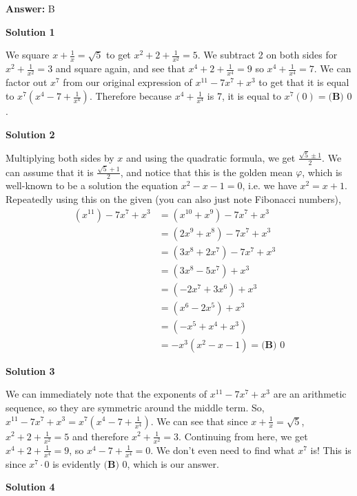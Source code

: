 \begin{enumerate}
 \textbf{Answer: }B



\textbf{Solution 1}

We square $x+\frac{1}{x}=\sqrt5$ to get $x^2+2+\frac{1}{x^2}=5$. We subtract 2 on both sides for $x^2+\frac{1}{x^2}=3$ and square again, and see that $x^4+2+\frac{1}{x^4}=9$ so $x^4+\frac{1}{x^4}=7$. We can factor out $x^7$ from our original expression of $x^{11}-7x^7+x^3$ to get that it is equal to $x^7(x^4-7+\frac{1}{x^4})$. Therefore because $x^4+\frac{1}{x^4}$ is 7, it is equal to $x^7(0)=\boxed{\textbf{(B) } 0}$.

 



\textbf{Solution 2}

Multiplying both sides by $x$ and using the quadratic formula, we get $\frac{\sqrt{5} \pm 1}{2}$. We can assume that it is $\frac{\sqrt{5}+1}{2}$, and notice that this is the golden mean $\varphi$, which is well-known to be a solution the equation $x^2-x-1=0$, i.e. we have $x^2=x+1$. Repeatedly using this on the given (you can also just note Fibonacci numbers), 
 \begin{align*}  (x^{11})-7x^7+x^3 &= (x^{10}+x^9)-7x^7+x^3 \\ &=(2x^9+x^8)-7x^7+x^3 \\ &=(3x^8+2x^7)-7x^7+x^3 \\ &=(3x^8-5x^7)+x^3 \\ &=(-2x^7+3x^6)+x^3 \\ &=(x^6-2x^5)+x^3 \\ &=(-x^5+x^4+x^3) \\ &=-x^3(x^2-x-1) = \boxed{\textbf{(B) } 0} \end{align*}





\textbf{Solution 3}

We can immediately note that the exponents of $x^{11}-7x^7+x^3$ are an arithmetic sequence, so they are symmetric around the middle term. So, $x^{11}-7x^7+x^3 = x^7(x^4-7+\frac{1}{x^4})$. We can see that since $x+\frac{1}{x} = \sqrt{5}$, $x^2+2+\frac{1}{x^2} = 5$ and therefore $x^2+\frac{1}{x^2} = 3$. Continuing from here, we get $x^4+2+\frac{1}{x^4} = 9$, so $x^4-7+\frac{1}{x^4} = 0$. We don't even need to find what $x^7$ is! This is since $x^7\cdot0$ is evidently $\boxed{\textbf{(B) } 0}$, which is our answer.

 



\textbf{Solution 4}


\end{enumerate}
